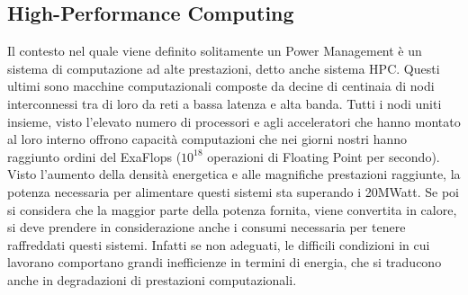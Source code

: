\subsection{High-Performance Computing}
Il contesto nel quale viene definito solitamente un Power Management è un sistema di computazione ad alte prestazioni, detto anche sistema HPC. Questi ultimi sono macchine computazionali composte da decine di centinaia di nodi interconnessi tra di loro da reti a bassa latenza e alta banda. 
Tutti i nodi uniti insieme, visto l'elevato numero di processori e agli acceleratori che hanno montato al loro interno offrono capacità computazioni che nei giorni nostri hanno raggiunto ordini del ExaFlops ($10^{18}$ operazioni di  Floating Point per secondo).
Visto l'aumento della densità energetica e alle magnifiche prestazioni raggiunte, la potenza necessaria per alimentare questi sistemi sta superando i 20MWatt. Se poi si considera che la maggior parte della potenza fornita, viene convertita in calore, si deve prendere in considerazione anche i consumi necessaria per tenere raffreddati questi sistemi. Infatti se non adeguati, le difficili condizioni in cui lavorano comportano grandi inefficienze in termini di energia, che si traducono anche in degradazioni di prestazioni computazionali. 
